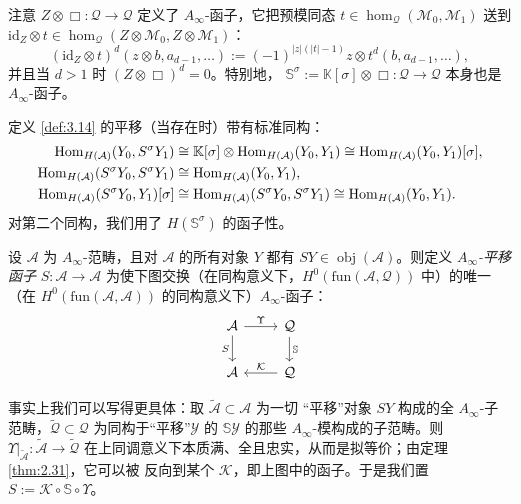 注意 $Z\otimes\Box:\mathcal Q\to\mathcal Q$ 定义了 $A_\infty$-函子，它把预模同态
$t\in\hom_{\mathcal Q}(\mathcal M_0,\mathcal M_1)$ 送到
$\mathrm{id}_Z\otimes t\in\hom_{\mathcal Q}(Z\otimes\mathcal M_0,
Z\otimes\mathcal M_1)$：
\[
  (\mathrm{id}_Z\otimes t)^d(z\otimes b,a_{d-1},\dots):=
  (-1)^{|z|(|t|-1)}z\otimes t^d(b,a_{d-1},\dots),
\]
并且当 $d>1$ 时 $(Z\otimes\Box)^d=0$。特别地，
$\mathbb S^\sigma:=\mathbb K[\sigma]\otimes\Box:\mathcal Q\to\mathcal Q$ 本身也是
$A_\infty$-函子。

定义 \ref{def:3.14} 的平移（当存在时）带有标准同构：
\begin{equation}\label{eq:3.34}
  \begin{aligned}
    \operatorname{Hom}_{H(\mathcal A)}(Y_0,S^\sigma Y_1)&\cong
    \mathbb K[\sigma]\otimes\operatorname{Hom}_{H(\mathcal A)}(Y_0,Y_1)
    \cong\operatorname{Hom}_{H(\mathcal A)}(Y_0,Y_1)[\sigma],\\
    \operatorname{Hom}_{H(\mathcal A)}(S^\sigma Y_0,S^\sigma Y_1)&\cong
    \operatorname{Hom}_{H(\mathcal A)}(Y_0,Y_1),\\
    \operatorname{Hom}_{H(\mathcal A)}(S^\sigma Y_0,Y_1)[\sigma]&\cong
    \operatorname{Hom}_{H(\mathcal A)}(S^\sigma Y_0,S^\sigma Y_1)\cong
    \operatorname{Hom}_{H(\mathcal A)}(Y_0,Y_1).
  \end{aligned}
\end{equation}
对第二个同构，我们用了 $H(\mathbb S^\sigma)$ 的函子性。

\begin{Def}\label{def:3.15}
设 $\mathcal A$ 为 $A_\infty$-范畴，且对 $\mathcal A$ 的所有对象 $Y$ 都有
$SY\in\operatorname{obj}(\mathcal A)$。则定义 \emph{$A_\infty$-平移函子}
$S:\mathcal A\to\mathcal A$ 为使下图交换（在同构意义下，$H^0(\mathrm{fun}
(\mathcal A,\mathcal Q))$ 中）的唯一（在 $H^0(\mathrm{fun}(\mathcal A,
\mathcal A))$ 的同构意义下）$A_\infty$-函子：
\[
  \begin{tikzcd}
    \mathcal A \arrow[r, "{\Upsilon}"] \arrow[d, "{S}"'] & \mathcal Q
      \arrow[d, "{\mathbb S}"] \\
    \mathcal A & \mathcal Q \arrow[l, "{\mathcal K}"']
  \end{tikzcd}
\]
\end{Def}

事实上我们可以写得更具体：取 $\tilde{\mathcal A}\subset\mathcal A$ 为一切
“平移”对象 $SY$ 构成的全 $A_\infty$-子范畴，$\tilde{\mathcal Q}\subset
\mathcal Q$ 为同构于“平移”$\mathcal Y$ 的 $\mathbb S\mathcal Y$ 的那些
$A_\infty$-模构成的子范畴。则
$\Upsilon|_{\tilde{\mathcal A}}:\tilde{\mathcal A}\to\tilde{\mathcal Q}$
在上同调意义下本质满、全且忠实，从而是拟等价；由定理 \ref{thm:2.31}，它可以被
反向到某个 $\mathcal K$，即上图中的函子。于是我们置
$S:=\mathcal K\circ\mathbb S\circ\Upsilon$。

